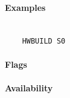         \paragraph{Examples}
            ~\\
            \verb'    HWBUILD S0'\\

        \paragraph{Flags}

        \paragraph{Availability}
            \pbavailability{\yes}{\no}{\no}{\no}{\no}
